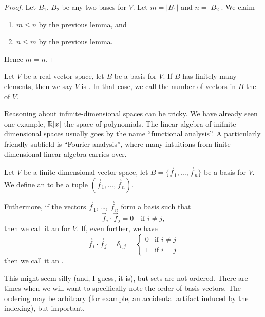 \begin{proof}
Let $B_{1}$, $B_{2}$ be any two bases for $V$. Let $m=|B_{1}|$ and $n=|B_{2}|$.
We claim
\begin{enumerate}
\item $m\leq n$ by the previous lemma, and
\item $n\leq m$ by the previous lemma.
\end{enumerate}
Hence $m=n$.
\end{proof}

\begin{definition}
Let $V$ be a real vector space, let $B$ be a basis for $V$. If $B$ has
finitely many elements, then we say $V$ is
. In that case, we call the number of vectors
in $B$ the  of $V$.
\end{definition}

\begin{remark}
Reasoning about infinite-dimensional spaces can be tricky. We have
already seen one example, $\mathbb{R}[x]$ the space of polynomials. The linear
algebra of inifnite-dimensional spaces usually goes by the name
``functional analysis''. A particularly friendly subfield is ``Fourier
analysis'', where many intuitions from finite-dimensional linear algebra
carries over.
\end{remark}

\begin{definition}
Let $V$ be a finite-dimensional vector space, let
$B=\{\vec{f}_{1},\dots,\vec{f}_{n}\}$ be a basis for $V$.
We define an  to be a tuple $(\vec{f}_{1},\dots,\vec{f}_{n})$.

Futhermore, if the vectors $\vec{f}_{1}$, \dots, $\vec{f}_{n}$ form a
basis such that
\begin{equation}
\vec{f}_{i}\cdot\vec{f}_{j}=0\quad\mbox{if }i\neq j,
\end{equation}
then we call it an  for $V$. If, even further,
we have
\begin{equation}
\vec{f}_{i}\cdot\vec{f}_{j}=\delta_{i,j}=\begin{cases}0&\mbox{if }i\neq j\\
1 & \mbox{if }i=j
\end{cases}
\end{equation}
then we call it an .
\end{definition}

\begin{remark}
This might seem silly (and, I guess, it is), but sets are not
ordered. There are times when we will want to specifically note the
order of basis vectors. The ordering may be arbitrary (for example, an
accidental artifact induced by the indexing), but important.
\end{remark}

